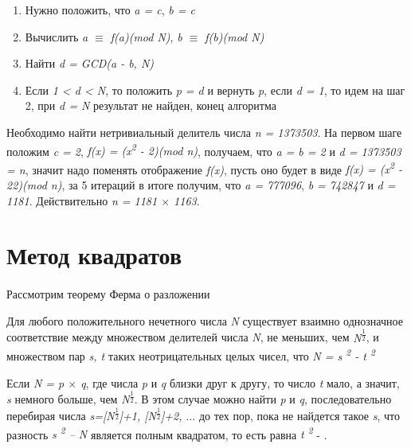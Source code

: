     \begin{enumerate}
     \item Нужно положить, что \textit{a = c}, \textit{b = c}
     \item Вычислить \textit{a {$\equiv$} f(a)(mod N)}, \textit{b {$\equiv$} f(b)(mod N)}
     \item Найти \textit{d = GCD(a - b, N)}
     \item Если \textit{1 < d < N}, то положить \textit{p = d} и вернуть \textit{p}, если \textit{d = 1}, то идем на шаг 2, при \textit{d = N} 
	результат не найден, конец алгоритма
    \end{enumerate}
  
  \begin{example}
    Необходимо найти нетривиальный делитель числа \textit{n = 1373503}. На первом шаге положим \textit{c = 2}, \textit{f(x) = (x\textsuperscript{2} - 2)(mod n)}, 
    получаем, что \textit{a = b = 2} и \textit{d = 1373503 = n}, значит надо поменять отображение \textit{f(x)}, пусть оно будет в виде 
    \textit{f(x) = (x\textsuperscript{2} - 22)(mod n)}, за 5 итераций в итоге получим, что \textit{a = 777096}, \textit{b = 742847} и \textit{d = 1181}. 
    Действительно \textit{n = 1181 {$\times$} 1163}.
  \end{example}  

\section{Метод квадратов}

\paragraph{} Рассмотрим теорему Ферма о разложении

  \begin{theorem}
    Для любого положительного нечетного числа \textit{N} существует взаимно однозначное соответствие между множеством делителей числа \textit{N}, 
    не меньших, чем \textit{N\textsuperscript{ {$\frac{1}{2}$}}}, и множеством пар \textit{{s, t}} таких неотрицательных целых чисел, что 
    \textit{N = s\textsuperscript{ 2} - t\textsuperscript{ 2}}
  \end{theorem}

  Если \textit{N = p {$\times$} q}, где числа \textit{p} и \textit{q} близки друг к другу, то число \textit{t} мало, а значит, \textit{s} немного больше,
  чем \textit{N\textsuperscript{ {$\frac{1}{2}$}}}. В этом случае можно найти \textit{p} и \textit{q}, последовательно перебирая числа
  \textit{s=[\textit{N\textsuperscript{ {$\frac{1}{2}$}}}]+1, [\textit{N\textsuperscript{ {$\frac{1}{2}$}}}]+2, {$\dots$}} до тех пор, пока не найдется 
  такое \textit{s}, что разность \textit{s\textsuperscript{ 2} – N} является полным квадратом, то есть равна \textit{t\textsuperscript{ 2}} - 
  \cite[Глава 6.4, страницы 216-225]{mah06}.
  
